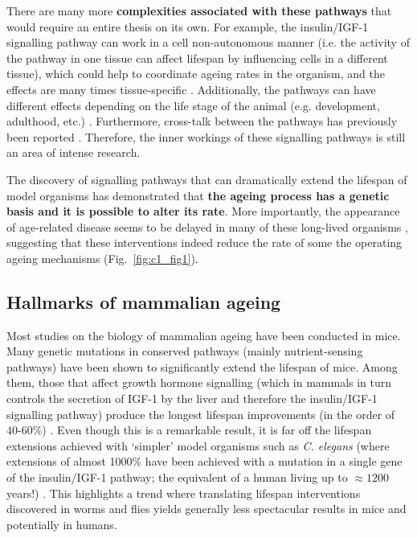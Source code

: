 \bigskip

There are many more \textbf{complexities associated with these pathways} that would require an entire thesis on its own. For example, the insulin/IGF-1 signalling pathway can work in a cell non-autonomous manner (i.e. the activity of the pathway in one tissue can affect lifespan by influencing cells in a different tissue), which could help to coordinate ageing rates in the organism, and the effects are many times tissue-specific \cite{Kenyon2005,Kenyon2010}. Additionally, the pathways can have different effects depending on the life stage of the animal (e.g. development, adulthood, etc.) \cite{Dillin2002}. Furthermore, cross-talk between the pathways has previously been reported \cite{Bonkowski2016, Greer2007}. Therefore, the inner workings of these signalling pathways is still an area of intense research.

\bigskip

The discovery of signalling pathways that can dramatically extend the lifespan of model organisms has demonstrated that \textbf{the ageing process has a genetic basis and it is possible to alter its rate}. More importantly, the appearance of age-related disease seems to be delayed in many of these long-lived organisms \cite{Kenyon2010,Arantes-Oliveira2003}, suggesting that these interventions indeed reduce the rate of some the operating ageing mechanisms (Fig.~\ref{fig:c1_fig1}). 

\smallskip

\subsection{Hallmarks of mammalian ageing} \label{s:1.1.3}

\smallskip

Most studies on the biology of mammalian ageing have been conducted in mice. Many genetic mutations in conserved pathways (mainly nutrient-sensing pathways) have been shown to significantly extend the lifespan of mice. Among them, those that affect growth hormone signalling (which in mammals in turn controls the secretion of IGF-1 by the liver and therefore the insulin/IGF-1 signalling pathway) produce the longest lifespan improvements (in the order of 40-60\%) \cite{Singh2019}. Even though this is a remarkable result, it is far off the lifespan extensions achieved with `simpler' model organisms such as \textit{C. elegans} (where extensions of almost 1000\% have been achieved with a mutation in a single gene of the insulin/IGF-1 pathway; the equivalent of a human living up to $\approx 1200$ years!) \cite{Ayyadevara2008}. This highlights a trend where translating lifespan interventions discovered in worms and flies yields generally less spectacular results in mice and potentially in humans.

